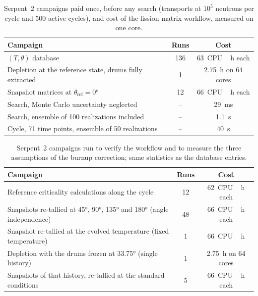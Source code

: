 \begin{table}[htbp]
  \centering
  \caption[Upfront campaigns and cost of the workflow]{Serpent~2 campaigns
  paid once, before any search (transports at $10^{5}$ neutrons per cycle and
  500 active cycles), and cost of the fission matrix workflow, measured on one
  core.}
  \label{cs:tab:cost}
  \begin{tabular}{p{74mm}cc}
    \toprule
    Campaign & Runs & Cost \\
    \midrule
    $(T,\theta)$ database & 136 & \SI{63}{CPU\,h} each \\
    Depletion at the reference state, drums fully extracted & 1 & \SI{2.75}{h} on 64 cores \\
    Snapshot matrices at $\theta_{\mathrm{ref}}=\ang{0}$ & 12 & \SI{66}{CPU\,h} each \\
    \midrule
    Search, Monte Carlo uncertainty neglected & -- & \SI{29}{ms} \\
    Search, ensemble of 100 realizations included & -- & \SI{1.1}{s} \\
    Cycle, 71 time points, ensemble of 50 realizations & -- & \SI{40}{s} \\
    \bottomrule
  \end{tabular}
\end{table}

\begin{table}[htbp]
  \centering
  \caption[Verification and assumption-test campaigns]{Serpent~2 campaigns
  run to verify the workflow and to measure the three assumptions of the
  burnup correction; same statistics as the database entries.}
  \label{cs:tab:testcost}
  \begin{tabular}{p{74mm}cc}
    \toprule
    Campaign & Runs & Cost \\
    \midrule
    Reference criticality calculations along the cycle & 12 & \SI{62}{CPU\,h} each \\
    Snapshots re-tallied at \ang{45}, \ang{90}, \ang{135} and \ang{180} (angle independence) & 48 & \SI{66}{CPU\,h} each \\
    Snapshot re-tallied at the evolved temperature (fixed temperature) & 1 & \SI{66}{CPU\,h} \\
    Depletion with the drums frozen at \ang{33.75} (single history) & 1 & \SI{2.75}{h} on 64 cores \\
    Snapshots of that history, re-tallied at the standard conditions & 5 & \SI{66}{CPU\,h} each \\
    \bottomrule
  \end{tabular}
\end{table}

